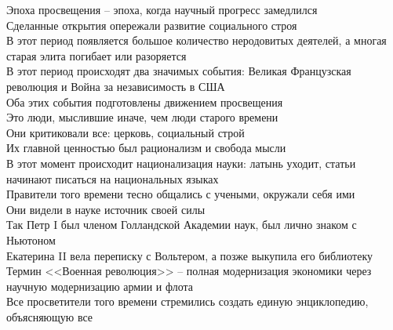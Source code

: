 \documentclass[12pt]{article}
\begin{document}
Эпоха просвещения -- эпоха, когда научный прогресс замедлился\\
Сделанные открытия опережали развитие социального строя\\
В этот период появляется большое количество неродовитых деятелей, а многая старая элита погибает или разоряется\\
В этот период происходят два значимых события: Великая Французская революция и Война за независимость в США\\
Оба этих события подготовлены движением просвещения\\
Это люди, мыслившие иначе, чем люди старого времени\\
Они критиковали все: церковь, социальный строй\\
Их главной ценностью был рационализм и свобода мысли\\
В этот момент происходит национализация науки: латынь уходит, статьи начинают писаться на национальных языках\\
Правители того времени тесно общались с учеными, окружали себя ими\\
Они видели в науке источник своей силы\\
Так Петр I был членом Голландской Академии наук, был лично знаком с Ньютоном\\
Екатерина II вела переписку с Вольтером, а позже выкупила его библиотеку\\
Термин <<Военная революция>> -- полная модернизация экономики через научную модернизацию армии и флота\\
Все просветители того времени стремились создать единую энциклопедию, объясняющую все
\end{document}
